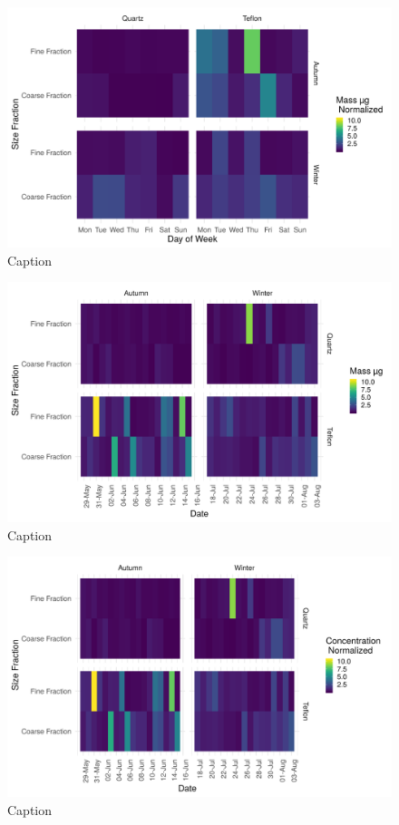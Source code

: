 \documentclass{nwureport}
\begin{document}
{\begin{figure}[!htb]
    \centering
    \includegraphics[width=\textwidth]{images/Density_DaySizeSeason_mass.png}
    \caption{Caption}

\end{figure}

\begin{figure}[!htb]
    \centering
    \includegraphics[width=\textwidth]{images/Density_FilterDateSizeSeason_mass.png}
    \caption{Caption}
    \label{fig:summary}
\end{figure}

\begin{figure}[!htb]
    \centering
    \includegraphics[width=\textwidth]{images/Density_FilterDateSizeSeason.png}
    \caption{Caption}
    \label{fig:summary}
\end{figure}

}
\end{document}
